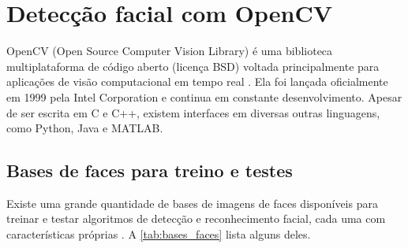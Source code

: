 \chapter{Detecção facial com OpenCV}\label{cap:opencv}


OpenCV (Open Source Computer Vision Library) é uma biblioteca multiplataforma de código aberto (licença BSD) voltada principalmente para aplicações de visão computacional em tempo real \cite{kaehler2016learning}. Ela foi lançada oficialmente em 1999 pela Intel Corporation e continua em constante desenvolvimento. 
Apesar de ser escrita em C e C++, existem interfaces em diversas outras linguagens, como Python, Java e MATLAB.

\section{Bases de faces para treino e testes}\label{sec:base_faces}

Existe uma grande quantidade de bases de imagens de faces disponíveis para treinar e testar algoritmos de detecção e reconhecimento facial, cada uma com características próprias \cite{grgic2013face, huang2007labeled, mozaffari2011twins}. A \autoref{tab:bases_faces} lista alguns deles.

